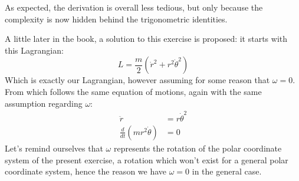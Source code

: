 \documentclass[solutions.tex]{subfiles}
\begin{document}
\begin{remark} As expected, the derivation is overall less tedious,
but only because the complexity is now hidden behind the
trigonometric identities.
\end{remark}
\begin{remark} A little later in the book, a solution to this
exercise is proposed: it starts with this Lagrangian:
\[
	L = \frac{m}{2}\left(\dot{r}^2+r^2\dot\theta^2\right)
\]
Which is exactly our Lagrangian, however assuming for some
reason that $\omega = 0$. From which follows the same equation
of motions, again with the same assumption regarding $\omega$:
\begin{align*}
	\ddot{r} &= r\dot\theta^2 \\
	\frac{d}{dt}\left(mr^2\dot\theta\right) &= 0
\end{align*}
Let's remind ourselves that $\omega$ represents the rotation of the polar
coordinate system of the present exercise, a rotation which won't
exist for a general polar coordinate system, hence the reason we have
$\omega=0$ in the general case.
\end{remark}
\end{document}
